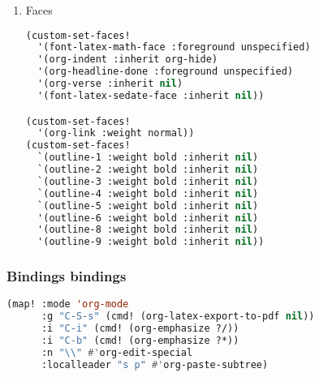 \documentclass[11pt]{article}
\begin{document}
\begin{enumerate}
\begin{enumerate}
  \begin{lstlisting}[language=Lisp]
(defun org-fontify-counter-cookies ()
  (setq
   org-font-lock-extra-keywords
   (append org-font-lock-extra-keywords
           '(("^[ \t]*\\(?:[-+*]\\|\\(?:[0-9]+\\|[a-zA-Z]\\)[.)]\\)[ \t]+\\(\\[@\\(?:start:\\)?\\(?:[0-9]+\\|[a-zA-Z]\\)\\]\\)"
              (1 'org-property-value prepend))))))

(add-hook 'org-font-lock-set-keywords-hook #'org-fontify-counter-cookies)
\end{lstlisting}
\end{enumerate}

  \item Faces
  \label{sec:faces-1}

  \begin{lstlisting}[language=Lisp]
(custom-set-faces!
  '(font-latex-math-face :foreground unspecified)
  '(org-indent :inherit org-hide)
  '(org-headline-done :foreground unspecified)
  '(org-verse :inherit nil)
  '(font-latex-sedate-face :inherit nil))

(custom-set-faces!
  '(org-link :weight normal))
(custom-set-faces!
  `(outline-1 :weight bold :inherit nil)
  `(outline-2 :weight bold :inherit nil)
  `(outline-3 :weight bold :inherit nil)
  `(outline-4 :weight bold :inherit nil)
  `(outline-5 :weight bold :inherit nil)
  '(outline-6 :weight bold :inherit nil)
  '(outline-8 :weight bold :inherit nil)
  '(outline-9 :weight bold :inherit nil))
\end{lstlisting}
\end{enumerate}

\subsubsection{Bindings\hfill{} bindings}
\label{sec:bindings}
\begin{lstlisting}[language=Lisp]
(map! :mode 'org-mode
      :g "C-S-s" (cmd! (org-latex-export-to-pdf nil))
      :i "C-i" (cmd! (org-emphasize ?/))
      :i "C-b" (cmd! (org-emphasize ?*))
      :n "\\" #'org-edit-special
      :localleader "s p" #'org-paste-subtree)
\end{lstlisting}
\end{document}
